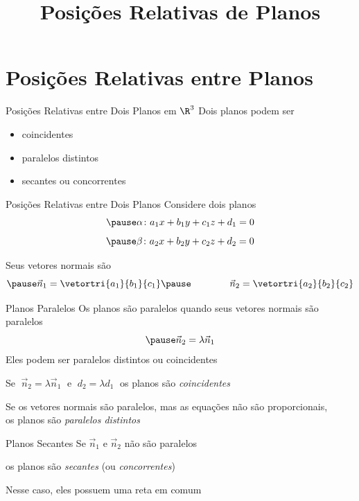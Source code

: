 \documentclass[fleqn,aspectratio=169,12pt]{beamer}
\title{Posições Relativas de Planos}
\begin{document}
\addtitle

\section{Posições Relativas entre Planos}

\begin{frame}{Posições Relativas entre Dois Planos em $\R^3$}
  Dois planos podem ser
  \pause
  \begin{itemize}[<+->]
      \item coincidentes
      \item paralelos distintos
      \item secantes ou concorrentes
  \end{itemize}
\end{frame}

\begin{frame}{Posições Relativas entre Dois Planos}
  Considere dois planos
  \[
    \pause
    \alpha\colon a_1x + b_1y + c_1z + d_1 = 0
  \]
  \[
    \pause
    \beta\colon  a_2x + b_2y + c_2z + d_2  =0
  \]

  \pause
  Seus vetores normais são
  \[
    \pause
    \vec{n}_1 = \vetortri{a_1}{b_1}{c_1}
    \pause \qquad\qquad
    \vec{n}_2 = \vetortri{a_2}{b_2}{c_2}
  \]
\end{frame}

\begin{frame}{Planos Paralelos}
  Os planos são paralelos quando seus vetores normais são paralelos
  \[
    \pause
    \vec{n}_2 = \lambda\vec{n}_1
  \]
  \pause
  Eles podem ser paralelos distintos ou coincidentes

  \pause
  \bigskip
  Se
  \(\;
    \vec{n}_2 = \lambda\vec{n}_1
  \;\)
  e
  \(\;
    d_2 = \lambda d_1
  \;\)
  \pause
  os planos são \emph{coincidentes}

  \pause
  \bigskip
  Se os vetores normais são paralelos,
  \pause
  mas as equações não são proporcionais, \\
  \pause
  os planos são \emph{paralelos distintos}
\end{frame}

\begin{frame}{Planos Secantes}
  Se
  \(
    \vec{n}_1
  \)
  e
  \(
    \vec{n}_2
  \)
  não são paralelos

  \pause
  os planos são \emph{secantes} (ou \emph{concorrentes})

  \pause
  \bigskip
  Nesse caso, eles possuem uma reta em comum
 \end{frame}
\end{document}
